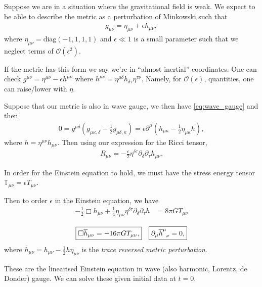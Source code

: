 Suppose we are in a situation where the gravitational field is weak. We expect to be able to describe the metric as a perturbation of Minkowski such that
\begin{align}
    g_{\mu \nu} = \eta_{\mu \nu} + \epsilon h_{\mu \nu}
,\end{align}
where $\eta_{\mu \nu} = \text{diag}\left( -1,1,1,1 \right)$ and $\epsilon \ll 1$ is a small parameter such that we neglect terms of $\mathcal{O}\left( \epsilon^2 \right)$. 

If the metric has this form we say we're in ``almost inertial'' coordinates. One can check $g^{\mu \nu} = \eta^{\mu \nu} - \epsilon h^{\mu \nu}$ where $h^{\mu \nu} = \eta^{\mu \delta} h_{\delta \tau} \eta^{\tau \nu}$. Namely, for $\mathcal{O}\left( \epsilon \right) $, quantities, one can raise/lower with $\eta$.

Suppose that our metric is also in wave gauge, we then have \cref{eq:wave_gauge} and then
\begin{align}
    0 = g^{\mu \delta} \left( g_{\mu \kappa , \delta} - \frac{1}{2} g_{\mu \delta , \kappa} \right) = \epsilon \partial^{\mu} \left( h_{\mu \kappa} - \frac{1}{2} \eta_{\mu \kappa} h \right) 
,\end{align}
where $h = \eta^{\mu \nu} h_{\mu \nu}$. Then using our expression for the Ricci tensor,
\begin{align}
    R_{\mu \nu} = -\frac{\epsilon}{2} \eta^{\delta \tau} \partial_\delta \partial_\tau h_{\mu \nu}
.\end{align}

In order for the Einstein equation to hold, we must have the stress energy tensor $\mathbb{T}_{\mu \nu} = \epsilon T_{\mu \nu}$.

Then to order $\epsilon$ in the Einstein equation, we have
\begin{align}
    -\frac{1}{2} \Box h_{\mu \nu} + \frac{1}{4} \eta_{\mu \nu} \eta^{\delta \tau} \partial_\delta \partial_\tau h &= 8 \pi G T_{\mu \nu} 
\end{align}

    \begin{align}
        \fbox{$\displaystyle \Box \overline{h}_{\mu \nu} = -16 \pi G T_{\mu \nu},$} &&
        \fbox{$\displaystyle \partial_\mu \tensor{\overline{h}}{^{\mu}_\nu} = 0,$}
\end{align}
where $\overline{h}_{\mu \nu} = h_{\mu \nu} -\frac{1}{2} h \eta_{\mu \nu}$ is the \textit{trace reversed metric perturbation}.

These are the linearised Einstein equation in wave (also harmonic, Lorentz, de Donder) gauge. We can solve these given initial data at $t = 0$.

